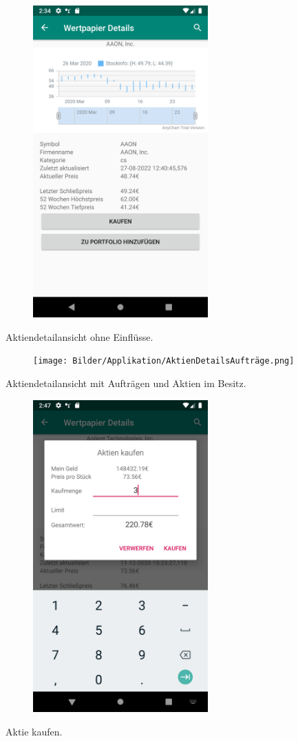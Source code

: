 \documentclass[10pt]{scrartcl}
\begin{document}
\begin{figure}[H]
	\centering
	\includegraphics[width=0.6\textwidth]{Bilder/Applikation/AktienDetails.png}
\end{figure}
Aktiendetailansicht ohne Einflüsse.

\begin{figure}[H]
	\centering
	\texttt{[image: Bilder/Applikation/AktienDetailsAufträge.png]}
\end{figure}
Aktiendetailansicht mit Aufträgen und Aktien im Besitz.

\begin{figure}[H]
	\centering
	\includegraphics[width=0.6\textwidth]{Bilder/Applikation/AktieKaufen.png}
\end{figure}
Aktie kaufen.
\end{document}
